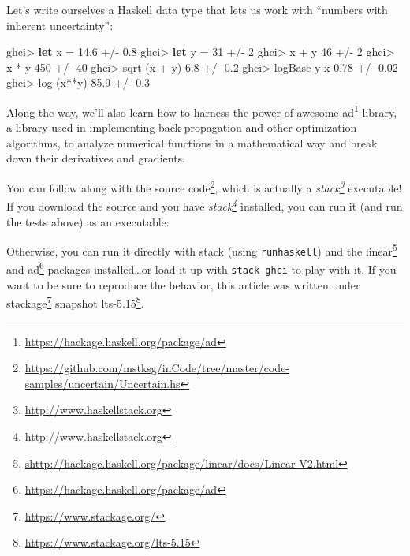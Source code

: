 \documentclass[]{article}
\newenvironment{Shaded}{}{}
\newcommand{\DecValTok}[1]{\textcolor[rgb]{0.25,0.63,0.44}{#1}}
\newcommand{\ExtensionTok}[1]{#1}
\newcommand{\FloatTok}[1]{\textcolor[rgb]{0.25,0.63,0.44}{#1}}
\newcommand{\FunctionTok}[1]{\textcolor[rgb]{0.02,0.16,0.49}{#1}}
\newcommand{\KeywordTok}[1]{\textcolor[rgb]{0.00,0.44,0.13}{\textbf{#1}}}
\newcommand{\NormalTok}[1]{#1}
\newcommand{\OperatorTok}[1]{\textcolor[rgb]{0.40,0.40,0.40}{#1}}
\newcommand{\OtherTok}[1]{\textcolor[rgb]{0.00,0.44,0.13}{#1}}
\renewcommand{\href}[2]{#2\footnote{\url{#1}}}
\begin{document}
Let's write ourselves a Haskell data type that lets us work with ``numbers with
inherent uncertainty'':

\begin{Shaded}
\begin{Highlighting}[]
\NormalTok{ghci}\OperatorTok{>} \KeywordTok{let}\NormalTok{ x }\OtherTok{=} \FloatTok{14.6} \OperatorTok{+/{-}} \FloatTok{0.8}
\NormalTok{ghci}\OperatorTok{>} \KeywordTok{let}\NormalTok{ y }\OtherTok{=} \DecValTok{31}   \OperatorTok{+/{-}} \DecValTok{2}
\NormalTok{ghci}\OperatorTok{>}\NormalTok{ x }\OperatorTok{+}\NormalTok{ y}
\DecValTok{46} \OperatorTok{+/{-}} \DecValTok{2}
\NormalTok{ghci}\OperatorTok{>}\NormalTok{ x }\OperatorTok{*}\NormalTok{ y}
\DecValTok{450} \OperatorTok{+/{-}} \DecValTok{40}
\NormalTok{ghci}\OperatorTok{>} \FunctionTok{sqrt}\NormalTok{ (x }\OperatorTok{+}\NormalTok{ y)}
\FloatTok{6.8} \OperatorTok{+/{-}} \FloatTok{0.2}
\NormalTok{ghci}\OperatorTok{>} \FunctionTok{logBase}\NormalTok{ y x}
\FloatTok{0.78} \OperatorTok{+/{-}} \FloatTok{0.02}
\NormalTok{ghci}\OperatorTok{>} \FunctionTok{log}\NormalTok{ (x}\OperatorTok{**}\NormalTok{y)}
\FloatTok{85.9} \OperatorTok{+/{-}} \FloatTok{0.3}
\end{Highlighting}
\end{Shaded}

Along the way, we'll also learn how to harness the power of awesome
\href{https://hackage.haskell.org/package/ad}{ad} library, a library used in
implementing back-propagation and other optimization algorithms, to analyze
numerical functions in a mathematical way and break down their derivatives and
gradients.

You can follow along with
\href{https://github.com/mstksg/inCode/tree/master/code-samples/uncertain/Uncertain.hs}{the
source code}, which is actually a
\emph{\href{http://www.haskellstack.org}{stack}} executable! If you download the
source and you have \emph{\href{http://www.haskellstack.org}{stack}} installed,
you can run it (and run the tests above) as an executable:

\begin{Shaded}
\end{Shaded}

Otherwise, you can run it directly with stack (using \texttt{runhaskell}) and
the
\href{shttp://hackage.haskell.org/package/linear/docs/Linear-V2.html}{linear}
and \href{https://hackage.haskell.org/package/ad}{ad} packages
installed\ldots or load it up with \texttt{stack\ ghci} to play with it. If you
want to be sure to reproduce the behavior, this article was written under
\href{https://www.stackage.org/}{stackage} snapshot
\href{https://www.stackage.org/lts-5.15}{lts-5.15}.
\end{document}
